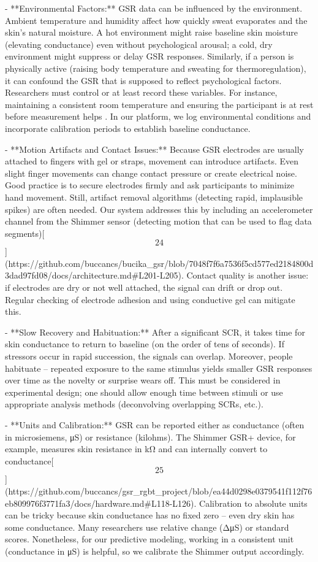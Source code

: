 \documentclass[12pt,a4paper]{article}
\begin{document}
- **Environmental Factors:** GSR data can be influenced by the
  environment. Ambient temperature and humidity affect how quickly sweat
  evaporates and the skin's natural moisture. A hot environment might
  raise baseline skin moisture (elevating conductance) even without
  psychological arousal; a cold, dry environment might suppress or delay
  GSR responses. Similarly, if a person is physically active (raising
  body temperature and sweating for thermoregulation), it can confound
  the GSR that is supposed to reflect psychological factors. Researchers
  must control or at least record these variables. For instance,
  maintaining a consistent room temperature and ensuring the participant
  is at rest before measurement
  helps \citep{Boucsein2012}.
  In our platform, we log environmental conditions and incorporate
  calibration periods to establish baseline conductance.

- **Motion Artifacts and Contact Issues:** Because GSR electrodes are
  usually attached to fingers with gel or straps, movement can introduce
  artifacts. Even slight finger movements can change contact pressure or
  create electrical noise. Good practice is to secure electrodes firmly
  and ask participants to minimize hand movement. Still, artifact
  removal algorithms (detecting rapid, implausible spikes) are often
  needed. Our system addresses this by including an accelerometer
  channel from the Shimmer sensor (detecting motion that can be used to
  flag data
  segments)[\[24\]](https://github.com/buccancs/bucika_gsr/blob/7048f7f6a7536f5cd577ed2184800d3dad97fd08/docs/architecture.md#L201-L205).
  Contact quality is another issue: if electrodes are dry or not well
  attached, the signal can drift or drop out. Regular checking of
  electrode adhesion and using conductive gel can mitigate this.

- **Slow Recovery and Habituation:** After a significant SCR, it takes
  time for skin conductance to return to baseline (on the order of tens
  of seconds). If stressors occur in rapid succession, the signals can
  overlap. Moreover, people habituate -- repeated exposure to the same
  stimulus yields smaller GSR responses over time as the novelty or
  surprise wears off. This must be considered in experimental design;
  one should allow enough time between stimuli or use appropriate
  analysis methods (deconvolving overlapping SCRs, etc.).

- **Units and Calibration:** GSR can be reported either as conductance
  (often in microsiemens, μS) or resistance (kilohms). The Shimmer GSR+
  device, for example, measures skin resistance in kΩ and can internally
  convert to
  conductance[\[25\]](https://github.com/buccancs/gsr_rgbt_project/blob/ea44d0298e0379541f112f76eb809976f3771fa3/docs/hardware.md#L118-L126).
  Calibration to absolute units can be tricky because skin conductance
  has no fixed zero -- even dry skin has some conductance. Many
  researchers use relative change (ΔμS) or standard scores. Nonetheless,
  for our predictive modeling, working in a consistent unit (conductance
  in μS) is helpful, so we calibrate the Shimmer output accordingly.
\end{document}
